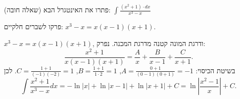 
\begin{question}
(שאלה חובה)
פתרו את האינטגרל הבא:
$\displaystyle\int\frac{(x^2+1)\cdot dx}{x^3-x}$
\end{question}

\begin{hint}
פרקו לשברים חלקיים: $x^3-x=x(x-1)(x+1)$.
\end{hint}

\begin{solution}
$x^3-x=x(x-1)(x+1)$, ודרגת המונה קטנה מדרגת המכנה. נפרק:
\[ \frac{x^2+1}{x(x-1)(x+1)}=\frac{A}{x}+\frac{B}{x-1}+\frac{C}{x+1}. \]
בשיטת הכיסוי: $A=\frac{0+1}{(0-1)(0+1)}=-1$, $B=\frac{1+1}{1\cdot 2}=1$, $C=\frac{1+1}{(-1)(-2)}=1$. לכן
\[ \int\frac{x^2+1}{x^3-x}dx=-\ln|x|+\ln|x-1|+\ln|x+1|+C=\boxed{\ln\left|\frac{x^2-1}{x}\right|+C}. \]
\end{solution}

